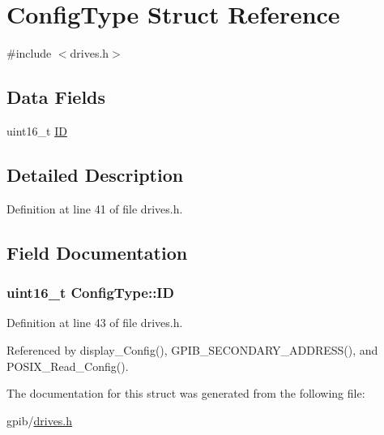 \hypertarget{structConfigType}{}\section{Config\+Type Struct Reference}
\label{structConfigType}


{\ttfamily \#include $<$drives.\+h$>$}

\subsection*{Data Fields}
\begin{DoxyCompactItemize}
\item 
uint16\+\_\+t \hyperlink{structConfigType_a7d89346361dc0f06db0917c7ff37501a}{ID}
\end{DoxyCompactItemize}


\subsection{Detailed Description}


Definition at line 41 of file drives.\+h.



\subsection{Field Documentation}
\subsubsection[{\texorpdfstring{ID}{ID}}]{\setlength{\rightskip}{0pt plus 5cm}uint16\+\_\+t Config\+Type\+::\+ID}\hypertarget{structConfigType_a7d89346361dc0f06db0917c7ff37501a}{}\label{structConfigType_a7d89346361dc0f06db0917c7ff37501a}


Definition at line 43 of file drives.\+h.



Referenced by display\+\_\+\+Config(), G\+P\+I\+B\+\_\+\+S\+E\+C\+O\+N\+D\+A\+R\+Y\+\_\+\+A\+D\+D\+R\+E\+S\+S(), and P\+O\+S\+I\+X\+\_\+\+Read\+\_\+\+Config().



The documentation for this struct was generated from the following file\+:\begin{DoxyCompactItemize}
\item 
gpib/\hyperlink{drives_8h}{drives.\+h}\end{DoxyCompactItemize}
